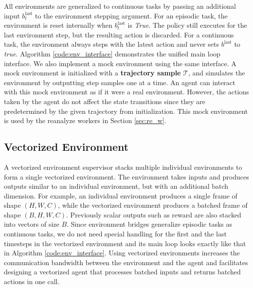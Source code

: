 All environments are generalized to continuous tasks by passing an additional input $b^\text{last}_t$ to the environment stepping argument.
For an episodic task, the environment is reset internally when $b^{\text{last}}_t$ is \textit{True}.
The policy still executes for the last environment step, but the resulting action is discarded.
For a continuous task, the environment always steps with the latest action and never sets $b^\text{last}$ to \textit{true}.
Algorithm \ref{code:env_interface} demonstrates the unified main loop interface.
We also implement a mock environment \cite{MockObject__2021} using the same interface.
A mock environment is initialized with a \textbf{trajectory sample} $\mathcal{T}$, and simulates the environment by outputting step samples one at a time.
An agent can interact with this mock environment as if it were a real environment.
However, the actions taken by the agent do not affect the state transitions since they are predetermined by the given trajectory from initialization.
This mock environment is used by the reanalyze workers in Section \ref{sec:re_w}.


\subsection{Vectorized Environment} \label{sec:vec_env}
A vectorized environment supervisor stacks multiple individual environments to form a single vectorized environment.
The environment takes inputs and produces outputs similar to an individual environment, but with an additional batch dimension.
For example, an individual environment produces a single frame of shape $(H, W, C)$, while the vectorized environment produces a batched frame of shape $(B, H, W, C)$.
Previously scalar outputs such as reward are also stacked into vectors of size $B$.
Since environment bridges generalize episodic tasks as continuous tasks, we do not need special handling for the first and the last timesteps in the vectorized environment and its main loop looks exactly like that in Algorithm \ref{code:env_interface}.
Using vectorized environments increases the communication bandwidth between the environment and the agent and facilitates designing a vectorized agent that processes batched inputs and returns batched actions in one call.

